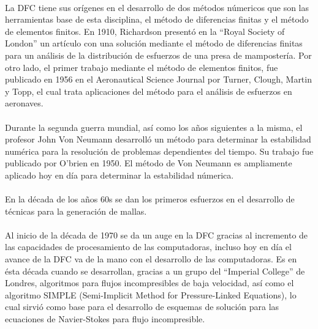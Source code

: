 \documentclass[letterpaper, openright, 12pt]{book}
\begin{document}
    \paragraph*{}
    La DFC tiene sus orígenes en el desarrollo de dos métodos
    númericos que son las herramientas base de esta disciplina,
    el método de diferencias finitas y el método de elementos
    finitos. En 1910, Richardson presentó en la ``Royal Society of
    London'' un artículo con una solución mediante el método de
    diferencias finitas para un análisis de la distribución de
    esfuerzos de una presa de mampostería. Por otro lado, el primer
    trabajo mediante el método de elementos finitos, fue publicado
    en 1956 en el Aeronautical Science Journal por Turner, Clough,
    Martin y Topp, el cual trata aplicaciones del método para el
    análisis de esfuerzos en aeronaves.\cite{tj-chung}

    \paragraph*{}
    Durante la segunda guerra mundial, así como los años siguientes
    a la misma, el profesor John Von Neumann desarrolló un método
    para determinar la estabilidad numérica para la resolución de
    problemas dependientes del tiempo. Su trabajo fue publicado por
    O'brien en 1950. El método de Von Neumann es ampliamente
    aplicado hoy en día para determinar la estabilidad
    númerica.\cite{pletcher-CFD-HeatTransfer}

    \paragraph*{}
    En la década de los años 60s se dan los primeros esfuerzos en el
    desarrollo de técnicas para la generación de mallas.\cite{liseikin1999grid}

    \paragraph*{}
    Al inicio de la década de 1970 se da un auge en la DFC gracias
    al incremento de las capacidades de procesamiento de las
    computadoras, incluso hoy en día el avance de la DFC va de la
    mano con el desarrollo de las computadoras.\cite{blazek} Es en
    ésta década cuando se desarrollan, gracias a un grupo del
    ``Imperial College'' de Londres, algoritmos para flujos
    incompresibles de baja velocidad, así como el algoritmo SIMPLE
    (Semi-Implicit Method for Pressure-Linked Equations), lo cual
    sirvió como base para el desarrollo de esquemas de solución para
    las ecuaciones de Navier-Stokes para flujo
    incompresible.\cite{pletcher-CFD-HeatTransfer}
\end{document}
